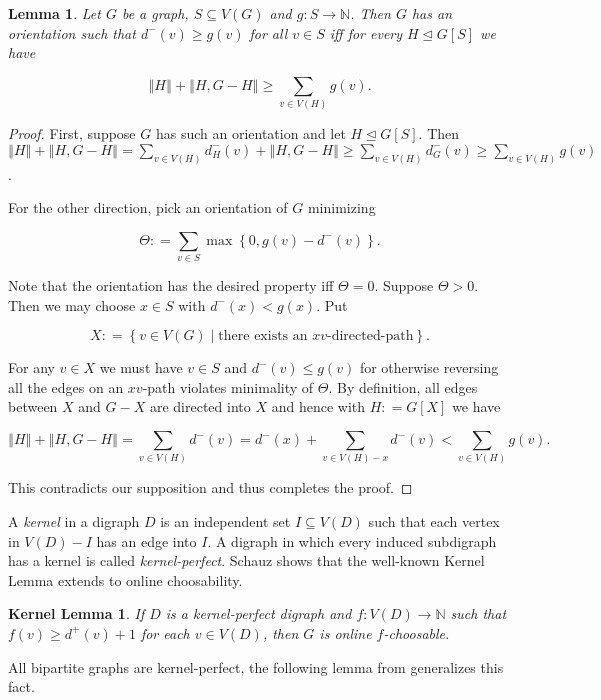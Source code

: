 \documentclass[12pt]{article}
\theoremstyle{plain}
\newtheorem{lem}[thm]{Lemma}
\newtheorem*{KernelLemma}{Kernel Lemma}
\theoremstyle{definition}
\theoremstyle{remark}
\newcommand{\IN}{\mathbb{N}}
\newcommand{\set}[1]{\left\{ #1 \right\}}
\newcommand{\setb}[3]{\left\{ #1 \in #2 \mid #3 \right\}}
\newcommand{\size}[1]{\left\Vert#1\right\Vert}
\newcommand{\func}[3]{#1\colon #2 \rightarrow #3}
\newcommand{\DefinedAs}{\mathrel{\mathop:}=}
\begin{document}
\begin{lem}\label{InOrientations}
Let $G$ be a graph, $S \subseteq V(G)$ and $\func{g}{S}{\IN}$.  Then $G$ has an orientation such that $d^-(v) \geq g(v)$ for all $v \in S$ iff for every $H \unlhd G[S]$ we have

\[\size{H} + \size{H, G - H} \geq \sum_{v \in V(H)} g(v).\]
\end{lem}
\begin{proof}
First, suppose $G$ has such an orientation and let $H \unlhd G[S]$.  Then $\size{H} + \size{H, G - H} = \sum_{v \in V(H)} d_H^-(v) + \size{H, G-H} \ge \sum_{v \in V(H)} d_G^-(v) \ge \sum_{v \in V(H)} g(v)$.

For the other direction, pick an orientation of $G$ minimizing

\[\Theta \DefinedAs \sum_{v \in S} \max\set{0, g(v) - d^-(v)}.\]

\noindent Note that the orientation has the desired property iff $\Theta = 0$. Suppose $\Theta > 0$.  Then we may choose $x \in S$ with $d^-(x) < g(x)$. Put

\[X \DefinedAs \setb{v}{V(G)}{\text{there exists an $xv$-directed-path}}.\]

\noindent For any $v \in X$ we must have $v \in S$ and $d^-(v) \le g(v)$ for otherwise reversing all the edges on an $xv$-path violates minimality of $\Theta$.  By definition, all edges between $X$ and $G-X$ are directed into $X$ and hence with $H \DefinedAs G[X]$ we have

\[\size{H} + \size{H, G-H} = \sum_{v \in V(H)} d^-(v) = d^-(x) + \sum_{v \in V(H) - x} d^-(v) < \sum_{v \in V(H)} g(v).\]

\noindent This contradicts our supposition and thus completes the proof.
\end{proof}

A \emph{kernel} in a digraph $D$ is an independent set $I \subseteq V(D)$ such that each vertex in $V(D) - I$ has an edge into $I$.  A digraph in which every induced subdigraph has a kernel is called \emph{kernel-perfect}.  Schauz \cite{schauz2009mr} shows that the well-known Kernel Lemma extends to online choosability.

\begin{KernelLemma}
If $D$ is a kernel-perfect digraph and $\func{f}{V(D)}{\IN}$ such that $f(v) \geq d^+(v) + 1$ for each $v \in V(D)$, then $G$ is online $f$-choosable.
\end{KernelLemma}

All bipartite graphs are kernel-perfect, the following lemma from \cite{kostochkayancey2012ore} generalizes this fact.
\end{document}
